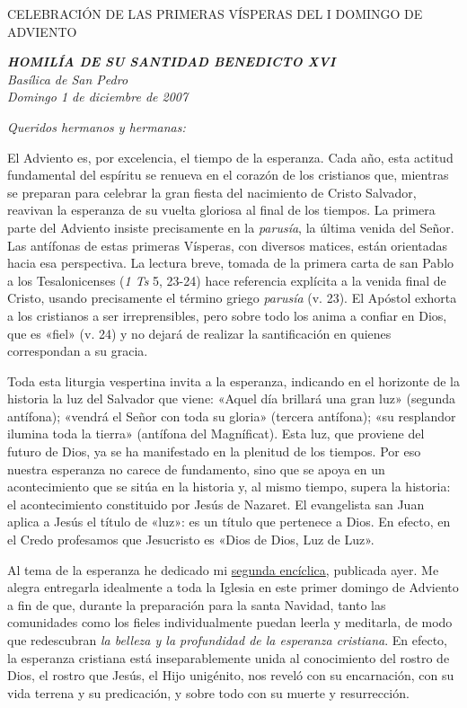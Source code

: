 CELEBRACIÓN DE LAS PRIMERAS VÍSPERAS DEL I DOMINGO DE ADVIENTO

\emph{\textbf{HOMILÍA DE SU SANTIDAD BENEDICTO
		XVI}\\[2\baselineskip]Basílica de San Pedro\\
	Domingo 1 de diciembre de 2007}

\emph{Queridos hermanos y hermanas:}

El Adviento es, por excelencia, el tiempo de la esperanza. Cada año,
esta actitud fundamental del espíritu se renueva en el corazón de los
cristianos que, mientras se preparan para celebrar la gran fiesta del
nacimiento de Cristo Salvador, reavivan la esperanza de su vuelta
gloriosa al final de los tiempos. La primera parte del Adviento insiste
precisamente en la \emph{parusía}, la última venida del Señor. Las
antífonas de estas primeras Vísperas, con diversos matices, están
orientadas hacia esa perspectiva. La lectura breve, tomada de la primera
carta de san Pablo a los Tesalonicenses (\emph{1 Ts} 5, 23-24) hace
referencia explícita a la venida final de Cristo, usando precisamente el
término griego \emph{parusía} (v. 23). El Apóstol exhorta a los
cristianos a ser irreprensibles, pero sobre todo los anima a confiar en
Dios, que es «fiel» (v. 24) y no dejará de realizar la santificación en
quienes correspondan a su gracia.

Toda esta liturgia vespertina invita a la esperanza, indicando en el
horizonte de la historia la luz del Salvador que viene: «Aquel día
brillará una gran luz» (segunda antífona); «vendrá el Señor con toda su
gloria» (tercera antífona); «su resplandor ilumina toda la tierra»
(antífona del Magníficat). Esta luz, que proviene del futuro de Dios, ya
se ha manifestado en la plenitud de los tiempos. Por eso nuestra
esperanza no carece de fundamento, sino que se apoya en un
acontecimiento que se sitúa en la historia y, al mismo tiempo, supera la
historia: el acontecimiento constituido por Jesús de Nazaret. El
evangelista san Juan aplica a Jesús el título de «luz»: es un título que
pertenece a Dios. En efecto, en el Credo profesamos que Jesucristo es
«Dios de Dios, Luz de Luz».

Al tema de la esperanza he dedicado mi
\href{/content/benedict-xvi/es/encyclicals/documents/hf_ben-xvi_enc_20071130_spe-salvi.html}{segunda
	encíclica}, publicada ayer. Me alegra entregarla idealmente a toda la
Iglesia en este primer domingo de Adviento a fin de que, durante la
preparación para la santa Navidad, tanto las comunidades como los fieles
individualmente puedan leerla y meditarla, de modo que redescubran
\emph{la belleza y la profundidad de la esperanza cristiana}. En efecto,
la esperanza cristiana está inseparablemente unida al conocimiento del
rostro de Dios, el rostro que Jesús, el Hijo unigénito, nos reveló con
su encarnación, con su vida terrena y su predicación, y sobre todo con
su muerte y resurrección.


